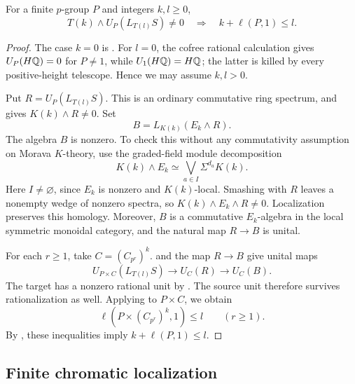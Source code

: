 \begin{theorem}\label{thm:height-gluing}
For a finite \(p\)-group \(P\) and integers \(k,l\ge0\),
\begin{equation}\label{eq:height-gluing}
 T(k)\wedge U_P(L_{T(l)}S)\ne0
 \quad\Longrightarrow\quad k+\ell(P,1)\le l.
\end{equation}
\end{theorem}
\begin{proof}
The case \(k=0\) is .  For \(l=0\),
the cofree rational calculation gives \(U_P(H\mathbb Q)=0\) for
\(P\ne1\), while \(U_1(H\mathbb Q)=H\mathbb Q\); the latter is killed by
every positive-height telescope.  Hence we may assume \(k,l>0\).

Put \(R=U_P(L_{T(l)}S)\).  This is an ordinary commutative ring
spectrum, and  gives
\(K(k)\wedge R\ne0\).  Set
\[
 B=L_{K(k)}(E_k\wedge R).
\]
The algebra \(B\) is nonzero.  To check this without any commutativity
assumption on Morava \(K\)-theory, use the graded-field module
decomposition \cite[Proposition~1.4]{HS}
\[
 K(k)\wedge E_k\simeq\bigvee_{a\in I}\Sigma^{d_a}K(k).
\]
Here \(I\ne\varnothing\), since \(E_k\) is nonzero and
\(K(k)\)-local.  Smashing with \(R\) leaves a nonempty wedge of
nonzero spectra, so \(K(k)\wedge E_k\wedge R\ne0\).  Localization
preserves this homology.  Moreover, \(B\) is a commutative
\(E_k\)-algebra in the local symmetric monoidal category, and the
natural map \(R\to B\) is unital.

For each \(r\ge1\), take \(C=(C_{p^r})^k\).
 and the map \(R\to B\) give unital
maps
\[
 U_{P\times C}(L_{T(l)}S)
 \longrightarrow U_C(R)\longrightarrow U_C(B).
\]
The target has a nonzero rational unit by
.  The source unit therefore survives
rationalization as well.  Applying  to
\(P\times C\), we obtain
\[
 \ell(P\times(C_{p^r})^k,1)\le l\qquad(r\ge1).
\]
By , these inequalities imply
\(k+\ell(P,1)\le l\).
\end{proof}

\subsection{Finite chromatic localization}

